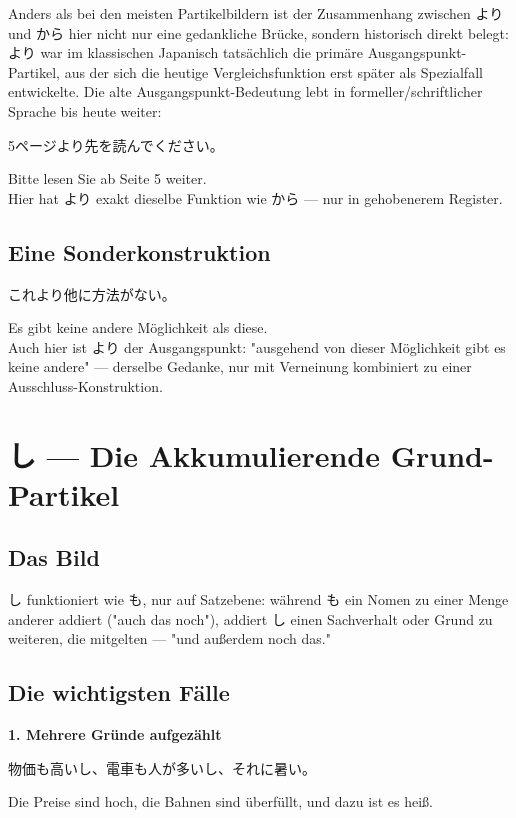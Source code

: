 \documentclass[12pt]{book}
\begin{document}
Anders als bei den meisten Partikelbildern ist der Zusammenhang zwischen より und から hier nicht nur eine gedankliche Brücke, sondern historisch direkt belegt: より war im klassischen Japanisch tatsächlich die primäre Ausgangspunkt-Partikel, aus der sich die heutige Vergleichsfunktion erst später als Spezialfall entwickelte. Die alte Ausgangspunkt-Bedeutung lebt in formeller/schriftlicher Sprache bis heute weiter:

\par\quad 5ページより先を読んでください。\\
\par\quad Bitte lesen Sie ab Seite 5 weiter.\\

Hier hat より exakt dieselbe Funktion wie から — nur in gehobenerem Register.

\section*{Eine Sonderkonstruktion}

\par\quad これより他に方法がない。\\
\par\quad Es gibt keine andere Möglichkeit als diese.\\

Auch hier ist より der Ausgangspunkt: "ausgehend von dieser Möglichkeit gibt es keine andere" — derselbe Gedanke, nur mit Verneinung kombiniert zu einer Ausschluss-Konstruktion.


\chapter{し — Die Akkumulierende Grund-Partikel}

\section*{Das Bild}

し funktioniert wie も, nur auf Satzebene: während も ein Nomen zu einer Menge anderer addiert ("auch das noch"), addiert し einen Sachverhalt oder Grund zu weiteren, die mitgelten — "und außerdem noch das."

\section*{Die wichtigsten Fälle}

\textbf{1. Mehrere Gründe aufgezählt}
\par\quad 物価も高いし、電車も人が多いし、それに暑い。\\
\par\quad Die Preise sind hoch, die Bahnen sind überfüllt, und dazu ist es heiß.\\
\end{document}
